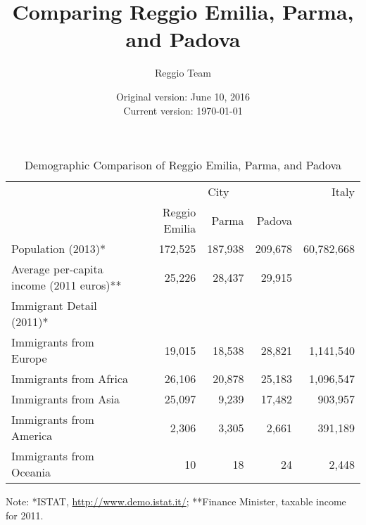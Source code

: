 \documentclass[12pt]{article}
\begin{document}
\title{Comparing Reggio Emilia, Parma, and Padova}
\author{Reggio Team}
\date{Original version: June 10, 2016 \\ Current version: \today}
\maketitle


\begin{table}[htbp]
\begin{center}
\caption{Demographic Comparison of Reggio Emilia, Parma, and Padova}
\label{tab:comparison}
\begin{tabular}{lrrrr}
\toprule
& \multicolumn{3}{c}{City} & Italy \\
\cmidrule{2-4}
& Reggio Emilia & Parma & Padova & \\
\midrule
Population (2013)* & 172,525 &  187,938 & 209,678 & 60,782,668 \\
Average per-capita income (2011 euros)**  & 25,226 & 28,437 & 29,915 & \\
Immigrant Detail (2011)* & & & & \\
\quad Immigrants from Europe & 19,015 & 18,538 & 28,821 & 1,141,540 \\
\quad Immigrants from Africa & 26,106  & 20,878 & 25,183 & 1,096,547 \\
\quad Immigrants from Asia & 25,097 & 9,239 & 17,482 & 903,957 \\
\quad Immigrants from America & 2,306 & 3,305 & 2,661 & 391,189 \\
\quad Immigrants from Oceania & 10 & 18 & 24 & 2,448 \\
\bottomrule
\end{tabular}
\end{center}
\footnotesize Note: *ISTAT, \url{http://www.demo.istat.it/}; **Finance Minister, taxable income for 2011.
\end{table}
\end{document}
